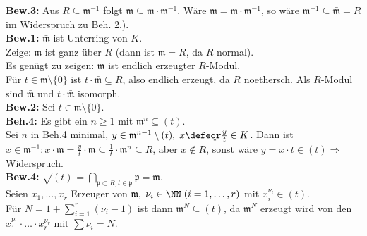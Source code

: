 \begin{Bew}
\textbf{Bew.3:} Aus $R \subseteq \mathfrak{m}^{-1}$ folgt $\mathfrak{m}
\subseteq \mathfrak{m} \cdot \mathfrak{m}^{-1}$. Wäre $\mathfrak{m} =
\mathfrak{m} \cdot \mathfrak{m}^{-1}$, so wäre $\mathfrak{m}^{-1} \subseteq
\bar{\mathfrak{m}} = R$ im Widerspruch zu Beh. 2.).\\
\textbf{Bew.1:} $\bar{\mathfrak{m}}$ ist Unterring von $K$.\\
Zeige: $\bar{\mathfrak{m}}$ ist ganz über $R$ (dann ist $\bar{\mathfrak{m}} =
R$, da $R$ normal).\\
Es genügt zu zeigen: $\bar{\mathfrak{m}}$ ist endlich erzeugter $R$-Modul.\\
Für $t \in \mathfrak{m} \setminus \{0\}$ ist $t \cdot \bar{\mathfrak{m}}
\subseteq R$, also endlich erzeugt, da $R$ noethersch.
Als $R$-Modul sind $\bar{\mathfrak{m}}$ und $t \cdot \bar{\mathfrak{m}}$
isomorph.\\
\textbf{Bew.2:} Sei $t \in \mathfrak{m} \setminus\{0\}$.\\
\textbf{Beh.4:} Es gibt ein $n \geq 1$ mit $\mathfrak{m}^n \subseteq (t)$.\\
Sei $n$ in Beh.4 minimal, $y \in \mathfrak{m}^{n-1} \setminus (t), \; x \defeqr
\frac{y}{t} \in K$.
Dann ist $x \in \mathfrak{m}^{-1}: x \cdot \mathfrak{m} = \frac{y}{t} \cdot
\mathfrak{m} \subseteq \frac{1}{t} \cdot \mathfrak{m}^n \subseteq R$, aber $x
\not\in R$, sonst wäre $y = x \cdot t \in (t) \Rightarrow$ Widerspruch.\\
\textbf{Bew.4:} $\sqrt{(t)} = \bigcap_{\mathfrak{p} \subset R, t \in
\mathfrak{p}} \mathfrak{p} = \mathfrak{m}$.\\
Seien $x_1, \dots, x_r$ Erzeuger von $\mathfrak{m}, \; \nu_i \in \NN
\;(i=1, \dots,r)$ mit $x_i^{\nu_i} \in (t)$.\\
Für $N = 1 + \sum_{i =1}^r(\nu_i -1)$ ist dann $\mathfrak{m}^N \subseteq (t)$,
da $\mathfrak{m}^N$ erzeugt wird von den $x_1^{\nu_1} \cdot \ldots \cdot
x_r^{\nu_r}$ mit $\sum \nu_i = N$.
\end{Bew}

